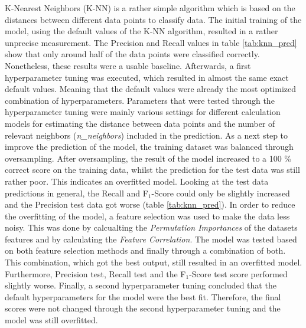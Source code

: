 K-Nearest Neighbors (K-NN) is a rather simple algorithm which is based on the distances between different data points to classify data. \citep{Yildirim2020} %
The initial training of the model, using the default values of the K-NN algorithm, resulted in a rather unprecise measurement. The Precision and Recall values in table \ref{tab:knn_pred} show that only around half of the data points were classified correctly. %
Nonetheless, these results were a usable baseline. Afterwards, a first hyperparameter tuning was executed, which resulted in almost the same exact default values. Meaning that the default values were already the most optimized combination of hyperparameters. Parameters that were tested through the hyperparameter tuning were mainly various settings for different calculation models for estimating the distance between data points and the number of relevant neighbors (\textit{n\_neighbors}) included in the prediction. %
As a next step to improve the prediction of the model, the training dataset was balanced through oversampling. After oversampling, the result of the model increased to a 100 \% correct score on the training data, whilst the prediction for the test data was still rather poor. This indicates an overfitted model. Looking at the test data predictions in general, the Recall and F$_1$-Score could only be slightly increased and the Precision test data got worse (table \ref{tab:knn_pred}). %
In order to reduce the overfitting of the model, a feature selection was used to make the data less noisy. This was done by calcualting the \textit{Permutation Importances} of the datasets features and by calculating the \textit{Feature Correlation}. The model was tested based on both feature selection methods and finally through a combination of both. This combination, which got the best output, still resulted in an overfitted model. Furthermore, Precision test, Recall test and the F$_1$-Score test score performed slightly worse. %
Finally, a second hyperparameter tuning concluded that the default hyperparameters for the model were the best fit. Therefore, the final scores were not changed through the second hyperparameter tuning and the model was still overfitted. %



